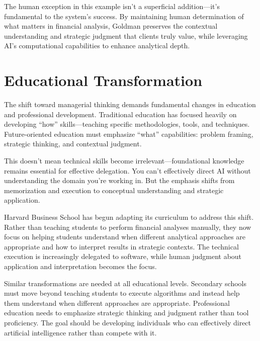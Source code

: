 \documentclass[
  Letterpaper,
]{scrbook}
\begin{document}
The human exception in this
example isn't a superficial addition---it's fundamental to the system's
success. By maintaining human determination of what matters in financial
analysis, Goldman preserves the contextual understanding and strategic
judgment that clients truly value, while leveraging AI's computational
capabilities to enhance analytical depth.

\section{\texorpdfstring{Educational
Transformation}{Educational Transformation}}\label{educational-transformation}

The shift toward managerial thinking demands fundamental changes in
education and professional development. Traditional
education has focused heavily on developing ``how'' skills---teaching
specific methodologies, tools, and techniques. Future-oriented education
must emphasize ``what'' capabilities: problem framing, strategic
thinking, and contextual
judgment.

This doesn't mean technical skills become irrelevant---foundational
knowledge remains essential for effective delegation. You can't
effectively direct AI without understanding the domain you're working
in. But the emphasis shifts from memorization and execution to
conceptual understanding and strategic application.

Harvard Business School has begun adapting its curriculum to address
this shift. Rather than teaching students to perform financial analyses
manually, they now focus on helping students understand when different
analytical approaches are appropriate and how to interpret results in
strategic contexts. The technical execution is increasingly delegated to
software, while human judgment about application and interpretation
becomes the focus.

Similar transformations are needed at all educational levels. Secondary
schools must move beyond teaching students to execute
algorithms and instead help them
understand when different approaches are appropriate. Professional
education needs to emphasize strategic thinking and judgment rather than
tool proficiency. The goal should be developing individuals who can
effectively direct artificial intelligence rather than compete with it.
\end{document}

